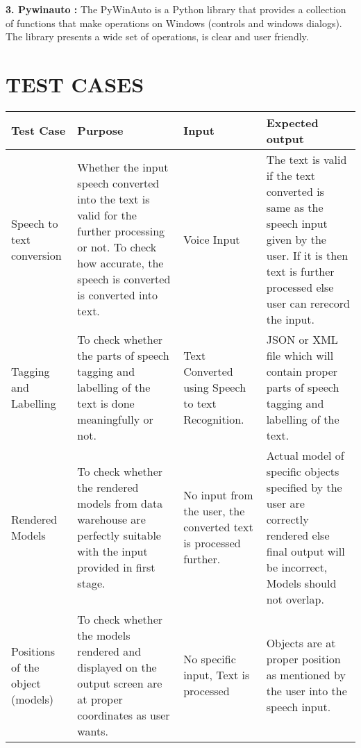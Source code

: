 \documentclass[12pt,a4paper,final,oneside]{report}
\begin{document}
\textbf{3. Pywinauto : }The PyWinAuto is a Python library that provides a collection of functions that make operations on Windows (controls and windows dialogs). The library presents a wide set of operations, is clear and user friendly.

\chapter{TEST CASES}
 \begin{table}[h!]
  \centering

  \begin{tabular}{|p{2.5cm}|p{4.5cm}|p{2cm}|p{4.5cm}|}
\hline
    Test Case&Purpose& Input&Expected output\\
    \hline
   Speech to text conversion&Whether the input speech converted into the text is valid for the further processing or not. To check how accurate, the speech is converted is converted into text.&Voice Input&The text is valid if the text converted is same as the speech input given by the user. If it is then text is further processed else user can rerecord the input.\\
    \hline
   Tagging and Labelling&To check whether the parts of speech tagging and labelling of the text is done meaningfully or not.&Text Converted using Speech to text Recognition.&JSON or XML file which will contain proper parts of speech tagging and labelling of the text.\\
 \hline
  Rendered Models& To check whether the rendered models from data warehouse are perfectly suitable with the input provided in first stage.&No input from the user, the converted text is processed further.&Actual model of specific objects specified by the user are correctly rendered else final output will be incorrect, Models should not overlap.\\
 \hline
   Positions of the object (models)&To check whether the models rendered and displayed on the output screen are at proper coordinates as user wants.&No specific input, Text is processed&Objects are at proper position as mentioned by the user into the speech input.\\

 \hline

  \end{tabular}
\end{table}
\end{document}
